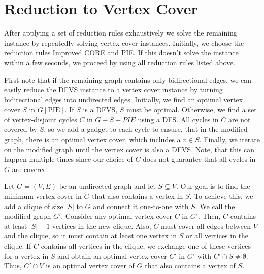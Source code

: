 
\section{Reduction to Vertex Cover}\label{sec:vertex_cover}

After applying a set of reduction rules exhaustively we solve the remaining instance by repeatedly solving vertex cover instances.
Initially, we choose the reduction rules Improved CORE and PIE.
If this doesn't solve the instance within a few seconds, we proceed by using all reduction rules listed above.

First note that if the remaining graph contains only bidirectional edges, we can easily reduce the DFVS instance to a vertex cover instance by turning bidirectional edges into undirected edges.
Initially, we find an optimal vertex cover $S$ in $G[\text{PIE}]$. If $S$ is a DFVS, $S$ must be optimal.
Otherwise, we find a set of vertex-disjoint cycles $C$ in $G-S - PIE$ using a DFS.
All cycles in $C$ are not covered by $S$, so we add a gadget to each cycle to ensure, that in the modified graph, there is an optimal vertex cover, which includes a $v\in S$.
Finally, we iterate on the modified graph until the vertex cover is also a DFVS. Note, that this can happen multiple times since our choice of $C$ does not guarantee that all cycles in $G$ are covered.

Let $G = (V,E)$ be an undirected graph and let $S \subseteq V$. Our goal is to find the minimum vertex cover in $G$ that also contains a vertex in $S$. To achieve this, we add a clique of size $|S|$ to $G$ and connect it one-to-one with $S$. We call the modified graph $G'$.
Consider any optimal vertex cover $C$ in $G'$. Then, $C$ contains at least $|S|-1$ vertices in the new clique.
Also, $C$ must cover all edges between $V$ and the clique, so it must contain at least one vertex in $S$ or all vertices in the clique.
If $C$ contains all vertices in the clique, we exchange one of these vertices for a vertex in $S$ and obtain an optimal vertex cover $C'$ in $G'$ with $C' \cap S \neq \emptyset$.
Thus, $C'\cap V$ is an optimal vertex cover of $G$ that also contains a vertex of $S$.

